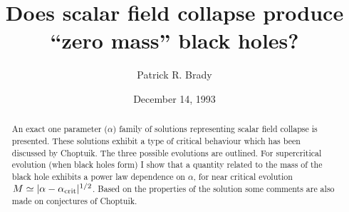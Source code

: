





\newcommand{\be}{\begin{equation}}
\newcommand{\ee}{\end{equation}}
\newcommand{\bea}{\begin{eqnarray}}
\newcommand{\eea}{\end{eqnarray}}
\renewcommand{\theequation}{\arabic{equation}}

%
%
%
%
%
%
%
%
%


\def\btt#1{{\tt$\backslash$#1}}

\draft
{}
\title{Does scalar field collapse produce ``zero mass'' black holes?}
\author{Patrick  R.  Brady }
\address{
 Department of Physics, University of Newcastle, Newcastle upon Tyne NE1 7RU}
\date{December 14, 1993}
\maketitle
\begin{abstract}
An exact one parameter ($\alpha$) family of solutions representing scalar field
 collapse is presented.  These solutions exhibit a type of critical behaviour
 which has been discussed by Choptuik.  The three possible evolutions are
 outlined.  For supercritical evolution (when black holes form)  I show
that a quantity related to the mass of the black hole exhibits a power law
dependence on $\alpha$, for near critical evolution
$M \simeq |\alpha-\alpha_{\rm crit}|^{1/2}$.  Based on the properties of the
solution some comments are also made on conjectures of Choptuik.
\end{abstract}
\pacs{}

\narrowtext



\narrowtext

